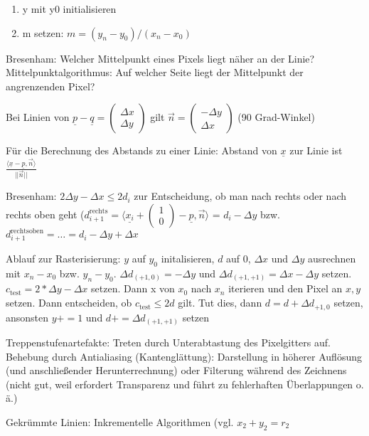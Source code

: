 \documentclass[12pt,landscape]{article}
\begin{document}
\begin{multicols}{3}
\begin{compactitem}
\begin{enumerate}
\item y mit y0 initialisieren
\item m setzen: $m = (y_n - y_0) / (x_n - x_0)$ 
\end{enumerate}
\item Bresenham: Welcher Mittelpunkt eines Pixels liegt näher an der Linie? Mittelpunktalgorithmus: Auf welcher Seite liegt der Mittelpunkt der angrenzenden Pixel?
\item Bei Linien von $\underline{p} - \underline{q} = \begin{pmatrix}\Delta x \\ \Delta y\end{pmatrix}$ gilt $\vec{n} = \begin{pmatrix}-\Delta y \\ \Delta x\end{pmatrix}$ (90 Grad-Winkel)
\item Für die Berechnung des Abstands zu einer Linie: Abstand von $\underline{x}$ zur Linie ist $\frac{\langle \underline{x} - \underline{p}, \vec{n} \rangle}{||\vec{n}||}$
\item Bresenham: $2 \Delta y - \Delta x \leq 2d_i$ zur Entscheidung, ob man nach rechts oder nach rechts oben geht ($d^\text{rechts}_{i+1} = \langle \underline{x_i} + \begin{pmatrix}1 \\ 0\end{pmatrix} - \underline{p}, \vec{n} \rangle$ = $d_i - \Delta y$ bzw. $d^\text{rechtsoben}_{i+1} = \dots = d_i - \Delta y + \Delta x$
\item Ablauf zur Rasterisierung: $y$ auf $y_0$ initalisieren, $d$ auf 0, $\Delta x$ und $\Delta y$ ausrechnen mit $x_n - x_0$ bzw. $y_n - y_0$. $\Delta d_{(+1,0)} = -\Delta y$ und $\Delta d_{(+1,+1)} = \Delta x - \Delta y$ setzen. $c_{\text{test}} = 2*\Delta y - \Delta x$ setzen. Dann x von $x_0$ nach $x_n$ iterieren und den Pixel an $x, y$ setzen. Dann entscheiden, ob $c_{\text{test}} \leq 2d$ gilt. Tut dies, dann $d = d + \Delta d_{+1,0}$ setzen, ansonsten $y += 1$ und $d += \Delta d_{(+1,+1)}$ setzen
\item Treppenstufenartefakte: Treten durch Unterabtastung des Pixelgitters auf. Behebung durch Antialiasing (Kantenglättung): Darstellung in höherer Auflösung (und anschließender Herunterrechnung) oder Filterung während des Zeichnens (nicht gut, weil erfordert Transparenz und führt zu fehlerhaften Überlappungen o. ä.)
\item Gekrümmte Linien: Inkrementelle Algorithmen (vgl. $x_2 + y_2 = r_2$

\end{compactitem}
\end{multicols}
\end{document}
